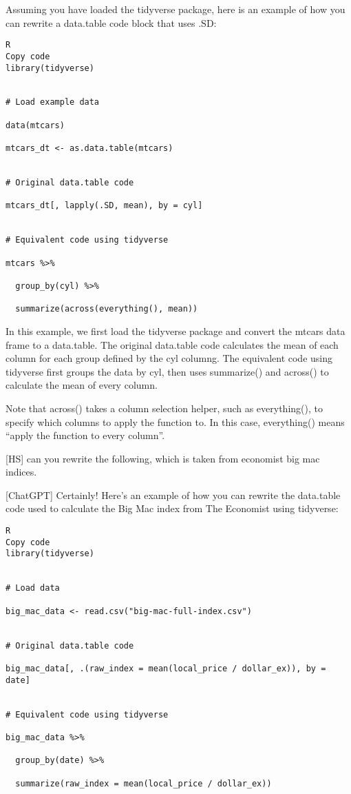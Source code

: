 \documentclass[
]{book}
\theoremstyle{definition}
\theoremstyle{definition}
\theoremstyle{definition}
\theoremstyle{definition}
\theoremstyle{remark}
\begin{document}
Assuming you have loaded the tidyverse package, here is an example of how you can rewrite a data.table code block that uses .SD:

\begin{verbatim}
R
Copy code
library(tidyverse)


# Load example data

data(mtcars)

mtcars_dt <- as.data.table(mtcars)


# Original data.table code

mtcars_dt[, lapply(.SD, mean), by = cyl]


# Equivalent code using tidyverse

mtcars %>%

  group_by(cyl) %>%

  summarize(across(everything(), mean))
\end{verbatim}

In this example, we first load the tidyverse package and convert the mtcars data frame to a data.table. The original data.table code calculates the mean of each column for each group defined by the cyl columng. The equivalent code using tidyverse first groups the data by cyl, then uses summarize() and across() to calculate the mean of every column.

Note that across() takes a column selection helper, such as everything(), to specify which columns to apply the function to. In this case, everything() means ``apply the function to every column''.

{[}HS{]} can you rewrite the following, which is taken from economist big mac indices.

{[}ChatGPT{]} Certainly! Here's an example of how you can rewrite the data.table code used to calculate the Big Mac index from The Economist using tidyverse:

\begin{verbatim}
R
Copy code
library(tidyverse)


# Load data

big_mac_data <- read.csv("big-mac-full-index.csv")


# Original data.table code

big_mac_data[, .(raw_index = mean(local_price / dollar_ex)), by = date]


# Equivalent code using tidyverse

big_mac_data %>%

  group_by(date) %>%

  summarize(raw_index = mean(local_price / dollar_ex))
\end{verbatim}
\end{document}
